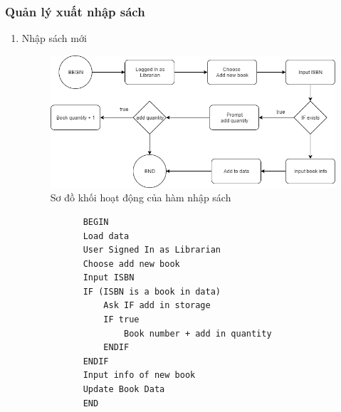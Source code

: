 \documentclass[12pt,a4paper]{report}
\begin{document}
            \subsubsection{Quản lý xuất nhập sách}
            \begin{enumerate}
            \item Nhập sách mới
            \begin{figure}[H]
                \centering
                \label{F:addbook}
                \includegraphics[scale = .5]{addbook.png}
                \caption{Sơ đồ khối hoạt động của hàm nhập sách}
            \end{figure}
            \begin{verbatim}
            BEGIN
            Load data
            User Signed In as Librarian
            Choose add new book
            Input ISBN
            IF (ISBN is a book in data)
                Ask IF add in storage
                IF true
                    Book number + add in quantity
                ENDIF
            ENDIF
            Input info of new book
            Update Book Data
            END


\end{verbatim}
\end{enumerate}
\end{document}
